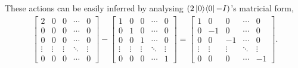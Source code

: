 These actions can be easily inferred by analysing $(2 \mathop{\mathinner{ |{0}\rangle \langle{0}|}} - I)$'s matricial form,
\begin{align}
    \left[ \begin{matrix}
        2 & 0 & 0 & \cdots & 0 \\
        0 & 0 & 0 & \cdots & 0 \\
        0 & 0 & 0 & \cdots & 0 \\
        \vdots & \vdots & \vdots & \ddots & \vdots \\
        0 & 0 & 0 & \cdots & 0
    \end{matrix} \right]
    -
    \left[ \begin{matrix}
        1 & 0 & 0 & \cdots & 0 \\
        0 & 1 & 0 & \cdots & 0 \\
        0 & 0 & 1 & \cdots & 0 \\
        \vdots & \vdots & \vdots & \ddots & \vdots \\
        0 & 0 & 0 & \cdots & 1
    \end{matrix} \right]
    =
    \left[ \begin{matrix}
        1 & 0 & 0 & \cdots & 0 \\
        0 & -1 & 0 & \cdots & 0 \\
        0 & 0 & -1 & \cdots & 0 \\
        \vdots & \vdots & \vdots & \ddots & \vdots \\
        0 & 0 & 0 & \cdots & -1
    \end{matrix} \right].
\end{align}

